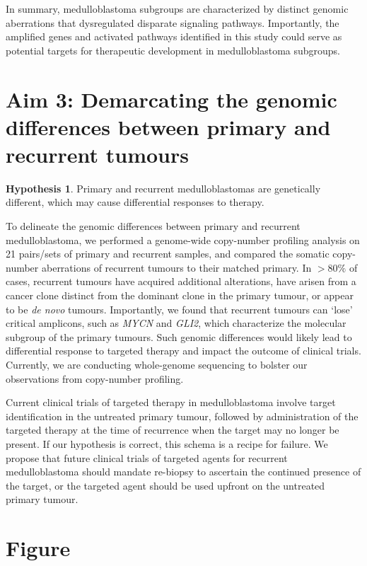 \documentclass[11pt,letterpaper]{article}
\theoremstyle{definition}
\newtheorem*{hypothesis}{Hypothesis}
\begin{document}
In summary, medulloblastoma subgroups are characterized by distinct genomic aberrations that dysregulated disparate signaling pathways. Importantly, the amplified genes and activated pathways identified in this study could serve as potential targets for therapeutic development in medulloblastoma subgroups.

\section{Aim 3: Demarcating the genomic differences between primary and recurrent tumours}

\begin{hypothesis}
Primary and recurrent medulloblastomas are genetically different, which may cause differential responses to therapy.
\end{hypothesis}

To delineate the genomic differences between primary and recurrent medulloblastoma, we performed a genome-wide copy-number profiling analysis on 21 pairs/sets of primary and recurrent samples, and compared the somatic copy-number aberrations of recurrent tumours to their matched primary. In $>80\%$ of cases, recurrent tumours have acquired additional alterations, have arisen from a cancer clone distinct from the dominant clone in the primary tumour, or appear to be \emph{de novo} tumours. Importantly, we found that recurrent tumours can ‘lose’ critical amplicons, such as \emph{MYCN} and \emph{GLI2}, which characterize the molecular subgroup of the primary tumours. Such genomic differences would likely lead to differential response to targeted therapy and impact the outcome of clinical trials. Currently, we are conducting whole-genome sequencing to bolster our observations from copy-number profiling.

Current clinical trials of targeted therapy in medulloblastoma involve target identification in the untreated primary tumour, followed by administration of the targeted therapy at the time of recurrence when the target may no longer be present. If our hypothesis is correct, this schema is a recipe for failure.  We propose that future clinical trials of targeted agents for recurrent medulloblastoma should mandate re-biopsy to ascertain the continued presence of the target, or the targeted agent should be used upfront on the untreated primary tumour.

\clearpage

\section{Figure}
\end{document}
